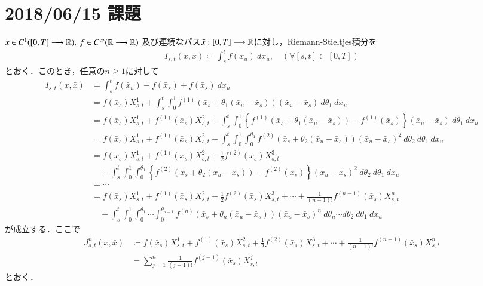 \section{2018/06/15 課題}
	$x \in C^1([0,T] \longrightarrow \mathbb{R}),\ f \in C^\infty(\mathbb{R} \longrightarrow \mathbb{R})$
	及び連続なパス$\bar{x}:[0,T] \longrightarrow \mathbb{R}$に対し，Riemann-Stieltjes積分を
	\begin{align}
		I_{s,t}(x,\bar{x}) \coloneqq \int_s^t f(\bar{x}_u)\ dx_u,
		\quad (\forall [s,t] \subset [0,T])
	\end{align}
	とおく．このとき，任意の$n \geq 1$に対して
	\begin{align}
		I_{s,t}(x,\bar{x}) 
		&= \int_s^t f(\bar{x}_u) - f(\bar{x}_s) + f(\bar{x}_s)\ dx_u \\
		&= f(\bar{x}_s) X^1_{s,t} + \int_s^t \int_0^1 f^{(1)}(\bar{x}_s + \theta_1(\bar{x}_u - \bar{x}_s))(\bar{x}_u - \bar{x}_s)\ d\theta_1\ dx_u \\
		&= f(\bar{x}_s) X^1_{s,t} + f^{(1)}(\bar{x}_s) X^2_{s,t}
			+ \int_s^t \int_0^1 \left\{f^{(1)}(\bar{x}_s + \theta_1(\bar{x}_u - \bar{x}_s)) - f^{(1)}(\bar{x}_s) \right\}(\bar{x}_u - \bar{x}_s)\ d\theta_1\ dx_u \\
		&= f(\bar{x}_s) X^1_{s,t} + f^{(1)}(\bar{x}_s) X^2_{s,t}
			+ \int_s^t \int_0^1 \int_0^{\theta_1} f^{(2)}(\bar{x}_s + \theta_2(\bar{x}_u - \bar{x}_s))(\bar{x}_u - \bar{x}_s)^2\ d\theta_2\ d\theta_1\ dx_u \\
		&= f(\bar{x}_s) X^1_{s,t} + f^{(1)}(\bar{x}_s) X^2_{s,t} + \frac{1}{2} f^{(2)}(\bar{x}_s) X^3_{s,t} \\
			&\quad + \int_s^t \int_0^1 \int_0^{\theta_1} \left\{ f^{(2)}(\bar{x}_s + \theta_2(\bar{x}_u - \bar{x}_s)) - f^{(2)}(\bar{x}_s) \right\}(\bar{x}_u - \bar{x}_s)^2\ d\theta_2\ d\theta_1\ dx_u \\
		&=\cdots \\
		&= f(\bar{x}_s) X^1_{s,t} + f^{(1)}(\bar{x}_s) X^2_{s,t} + \frac{1}{2} f^{(2)}(\bar{x}_s) X^3_{s,t} + \cdots + \frac{1}{(n-1)!} f^{(n-1)}(\bar{x}_s) X^n_{s,t} \\
			&\quad + \int_s^t \int_0^1 \int_0^{\theta_1} \cdots \int_0^{\theta_{n-1}} f^{(n)}(\bar{x}_s + \theta_n(\bar{x}_u - \bar{x}_s))(\bar{x}_u - \bar{x}_s)^n\ d\theta_n\cdots d\theta_2\ d\theta_1\ dx_u
	\end{align}
	が成立する．ここで
	\begin{align}
		J^n_{s,t}(x,\bar{x}) &\coloneqq f(\bar{x}_s) X^1_{s,t} + f^{(1)}(\bar{x}_s) X^2_{s,t} + \frac{1}{2} f^{(2)}(\bar{x}_s) X^3_{s,t} + \cdots + \frac{1}{(n-1)!} f^{(n-1)}(\bar{x}_s) X^n_{s,t} \\
		&= \sum_{j=1}^n \frac{1}{(j-1)!} f^{(j-1)}(\bar{x}_s) X^j_{s,t}
	\end{align}
	とおく．
	
